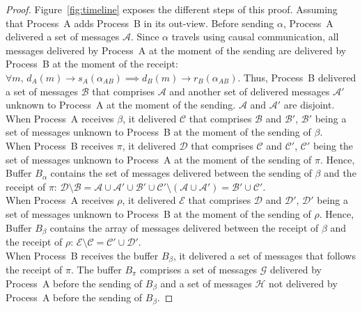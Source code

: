 \begin{theorem}
\end{theorem}

\begin{proof}
  Figure~\ref{fig:timeline} exposes the different steps of this proof. Assuming
  that Process~A adds Process~B in its out-view. Before sending $\alpha$,
  Process~A delivered a set of messages $\mathcal{A}$. Since $\alpha$ travels
  using causal communication, all messages delivered by Process~A at the moment
  of the sending are delivered by Process~B at the moment of the receipt:
  $\forall m,\, d_A(m) \rightarrow s_A(\alpha_{AB}) \implies d_B(m) \rightarrow
  r_B(\alpha_{AB})$.
  Thus, Process~B delivered a set of messages $\mathcal{B}$ that comprises
  $\mathcal{A}$ and another set of delivered messages $\mathcal{A}'$ unknown to
  Process~A at the moment of the sending. $\mathcal{A}$ and $\mathcal{A}'$ are
  disjoint.\\
  When Process~A receives $\beta$, it delivered $\mathcal{C}$ that comprises
  $\mathcal{B}$ and $\mathcal{B}'$, $\mathcal{B}'$ being a set of messages
  unknown to Process~B at the moment of the sending of $\beta$. \\
  When Process~B receives $\pi$, it delivered $\mathcal{D}$ that comprises
  $\mathcal{C}$ and $\mathcal{C}'$, $\mathcal{C}'$ being the set of messages
  unknown to Process~A at the moment of the sending of $\pi$. Hence, Buffer
  $B_\alpha$ contains the set of messages delivered between the sending of
  $\beta$ and the receipt of $\pi$:
  $\mathcal{D} \setminus \mathcal{B} = \mathcal{A} \cup \mathcal{A'} \cup
  \mathcal{B}' \cup \mathcal{C'} \setminus (\mathcal{A} \cup \mathcal{A}') =
  \mathcal{B}' \cup
  \mathcal{C}'$. \\
  When Process~A receives $\rho$, it delivered $\mathcal{E}$ that comprises
  $\mathcal{D}$ and $\mathcal{D}'$, $\mathcal{D}'$ being a set of messages
  unknown to Process~B at the moment of the sending of $\rho$. Hence, Buffer
  $B_\beta$ contains the array of messages delivered between the receipt of
  $\beta$ and the receipt of $\rho$:
  $\mathcal{E} \setminus \mathcal{C} = \mathcal{C}' \cup \mathcal{D}'$.\\
  When Process~B receives the buffer $B_\beta$, it delivered a set of messages
  that follows the receipt of $\pi$. The buffer $B_\pi$ comprises a set of
  messages $\mathcal{G}$ delivered by Process~A before the sending of $B_\beta$
  and a set of messages $\mathcal{H}$ not delivered by Process~A before the
  sending of $B_\beta$.
  

\end{proof}
